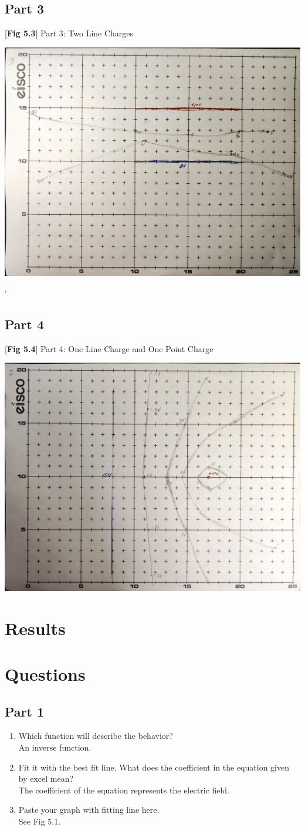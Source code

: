 \documentclass[titlepage]{article}
\begin{document}
	\subsection{Part 3}
	\begin{center}
			[\textbf{Fig 5.3}] Part 3: Two Line Charges	
	\end{center}
		\begin{center}
			\includegraphics[width=0.5\linewidth, frame]{part3}
		\end{center}
`	\subsection{Part 4}
		\begin{center}
			[\textbf{Fig 5.4}] Part 4: One Line Charge and One Point Charge	
		\end{center}

		\begin{center}
			\includegraphics[width=0.5\linewidth, frame]{part4}
		\end{center}
	\section{Results}
	\section{Questions}
	\subsection{Part 1}
		\begin{enumerate}
			\item Which function will describe the behavior?\\
				An inverse function.
			\item Fit it with the best fit line. What does the coefficient in the equation given by excel mean?\\
				The coefficient of the equation represents the electric field.
			\item Paste your graph with fitting line here.\\
				See Fig 5.1.
		\end{enumerate}
		\vspace{5cm}
\end{document}

